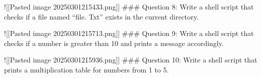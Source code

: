 !{[}{[}Pasted image 20250301215433.png{]}{]} \#\#\# Question 8: Write a
shell script that checks if a file named ``file. Txt'' exists in the
current directory.

\begin{Shaded}
\begin{Highlighting}[]
 \BuiltInTok{[}   \BuiltInTok{]}\KeywordTok{;} 
     
     
\end{Highlighting}
\end{Shaded}

!{[}{[}Pasted image 20250301215713.png{]}{]} \#\#\# Question 9: Write a
shell script that checks if a number is greater than 10 and prints a
message accordingly.

\begin{Shaded}
\begin{Highlighting}[]
   
 \BuiltInTok{[}  \BuiltInTok{]}\KeywordTok{;} 
     
     
\end{Highlighting}
\end{Shaded}

!{[}{[}Pasted image 20250301215936.png{]}{]} \#\#\# Question 10: Write a
shell script that prints a multiplication table for numbers from 1 to 5.

\begin{Shaded}
\begin{Highlighting}[]
 \DataTypeTok{\{}\DataTypeTok{\}}\KeywordTok{;} 
     \DataTypeTok{\{}\DataTypeTok{\}}\KeywordTok{;} 
           \OperatorTok{*} 
\end{Highlighting}
\end{Shaded}

